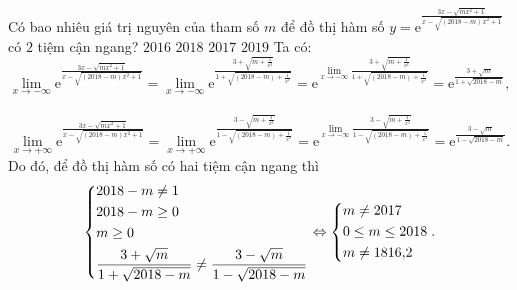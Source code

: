\begin{ex}%
	Có bao nhiêu giá trị nguyên của tham số $m$ để đồ thị hàm số $y=\mathrm{e}^{\tfrac{3x-\sqrt{mx^2+1}}{x-\sqrt{(2018-m)x^2+1}}}$ có $2$ tiệm cận ngang?
	\choice
	{$2016$}
	{\True $2018$}
	{$2017$}
	{$2019$}
	\loigiai
	{
		Ta có: $$\displaystyle\lim_{x \to -\infty} \mathrm{e}^{\tfrac{3x-\sqrt{mx^2+1}}{x-\sqrt{(2018-m)x^2+1}}}=\displaystyle\lim_{x \to -\infty} \mathrm{e}^{\tfrac{3+\sqrt{m+\tfrac{1}{x^2}}}{1+\sqrt{(2018-m)+\tfrac{1}{x^2}}}}= \mathrm{e}^{\displaystyle\lim_{x \to -\infty}\tfrac{3+\sqrt{m+\tfrac{1}{x^2}}}{1+\sqrt{(2018-m)+\tfrac{1}{x^2}}}}=\mathrm{e}^{\tfrac{3+\sqrt{m}}{1+\sqrt{2018-m}}},$$\\
		$$\displaystyle\lim_{x \to +\infty} \mathrm{e}^{\tfrac{3x-\sqrt{mx^2+1}}{x-\sqrt{(2018-m)x^2+1}}}=\displaystyle\lim_{x \to +\infty} \mathrm{e}^{\tfrac{3-\sqrt{m+\tfrac{1}{x^2}}}{1-\sqrt{(2018-m)+\tfrac{1}{x^2}}}}= \mathrm{e}^{\displaystyle\lim_{x \to -\infty}\tfrac{3-\sqrt{m+\tfrac{1}{x^2}}}{1-\sqrt{(2018-m)+\tfrac{1}{x^2}}}}=\mathrm{e}^{\tfrac{3-\sqrt{m}}{1-\sqrt{2018-m}}}.$$
		Do đó, để đồ thị hàm số có hai tiệm cận ngang thì $$\left\{\begin{aligned}&2018-m\ne1\\&2018-m\ge0\\&m\ge0\\&\dfrac{3+\sqrt{m}}{1+\sqrt{2018-m}}\ne\dfrac{3-\sqrt{m}}{1-\sqrt{2018-m}}\end{aligned}\right.\Leftrightarrow \left\{\begin{aligned}&m\ne2017\\&0\le m \le 2018\\&m\ne 1816{,}2\end{aligned}\right..$$
	}
\end{ex}

